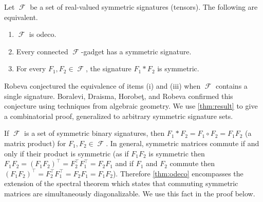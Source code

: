 \documentclass{theoretics}
\DeclareMathOperator{\fc}{\mathcal{F}}
\begin{document}
\begin{theorem}
    \label{thm:odeco}
    Let $\fc$ be a set of real-valued symmetric signatures (tensors). The following are equivalent.
    \begin{enumerate}[label=(\roman*)]
        \item $\fc$ is odeco.
        \item Every connected $\fc$-gadget has a symmetric signature.
        \item For every $F_1,F_2 \in \fc$, the signature $F_1 * F_2$ is symmetric.
    \end{enumerate}
\end{theorem}
Robeva \cite{robeva} conjectured the equivalence of items (i) and (iii) when $\fc$
contains a single signature.
Boralevi, Draisma, Horobeţ, and Robeva \cite{boralevi_orthogonal_2017} confirmed this conjecture
using techniques from algebraic geometry.
We use \autoref{thm:result} to give a combinatorial proof, generalized to arbitrary symmetric
signature sets.
\begin{remark}
    If $\fc$ is a set of symmetric binary signatures, then $F_1 * F_2 = F_1 \circ F_2 = F_1F_2$
    (a matrix product) for $F_1,F_2 \in \fc$. In general, symmetric matrices commute if and only
    if their product is symmetric (as if $F_1F_2$ is symmetric then $F_1F_2 = (F_1F_2)^\top = F_2^\top
    F_1^\top = F_2F_1$ and if $F_1$ and $F_2$ commute then $(F_1F_2)^\top = F_2^\top F_1^\top = F_2F_1 = F_1F_2$).
    Therefore \autoref{thm:odeco} encompasses the extension of the spectral theorem
    which states that commuting symmetric matrices are simultaneously diagonalizable. We use this
    fact in the proof below.
    \label{rem:spectral}
\end{remark}
\end{document}
